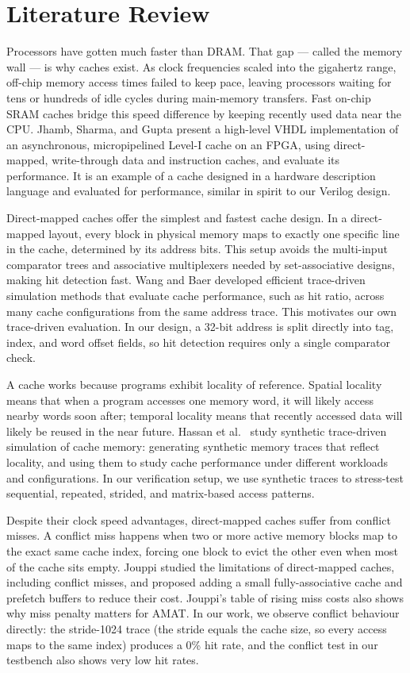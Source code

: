\documentclass[conference]{IEEEtran}
\begin{document}
\section{Literature Review}

Processors have gotten much faster than DRAM. That gap --- called the memory wall --- is why caches exist. As clock frequencies scaled into the gigahertz range, off-chip memory access times failed to keep pace, leaving processors waiting for tens or hundreds of idle cycles during main-memory transfers. Fast on-chip SRAM caches bridge this speed difference by keeping recently used data near the CPU. Jhamb, Sharma, and Gupta \cite{jhamb} present a high-level VHDL implementation of an asynchronous, micropipelined Level-I cache on an FPGA, using direct-mapped, write-through data and instruction caches, and evaluate its performance. It is an example of a cache designed in a hardware description language and evaluated for performance, similar in spirit to our Verilog design.

Direct-mapped caches offer the simplest and fastest cache design. In a direct-mapped layout, every block in physical memory maps to exactly one specific line in the cache, determined by its address bits. This setup avoids the multi-input comparator trees and associative multiplexers needed by set-associative designs, making hit detection fast. Wang and Baer \cite{wang} developed efficient trace-driven simulation methods that evaluate cache performance, such as hit ratio, across many cache configurations from the same address trace. This motivates our own trace-driven evaluation. In our design, a 32-bit address is split directly into tag, index, and word offset fields, so hit detection requires only a single comparator check.

A cache works because programs exhibit locality of reference. Spatial locality means that when a program accesses one memory word, it will likely access nearby words soon after; temporal locality means that recently accessed data will likely be reused in the near future. Hassan et al.\ \cite{hassan} study synthetic trace-driven simulation of cache memory: generating synthetic memory traces that reflect locality, and using them to study cache performance under different workloads and configurations. In our verification setup, we use synthetic traces to stress-test sequential, repeated, strided, and matrix-based access patterns.

Despite their clock speed advantages, direct-mapped caches suffer from conflict misses. A conflict miss happens when two or more active memory blocks map to the exact same cache index, forcing one block to evict the other even when most of the cache sits empty. Jouppi \cite{jouppi} studied the limitations of direct-mapped caches, including conflict misses, and proposed adding a small fully-associative cache and prefetch buffers to reduce their cost. Jouppi's table of rising miss costs also shows why miss penalty matters for AMAT. In our work, we observe conflict behaviour directly: the stride-1024 trace (the stride equals the cache size, so every access maps to the same index) produces a 0\% hit rate, and the conflict test in our testbench also shows very low hit rates.
\end{document}
